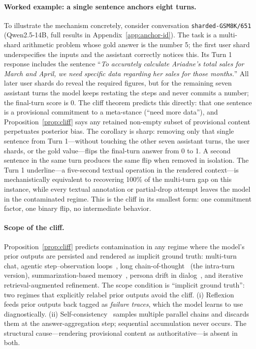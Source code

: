 \documentclass{article}
\begin{document}
\paragraph{Worked example: a single sentence anchors eight turns.}
\label{par:gsm8k651-example}
To illustrate the mechanism concretely, consider conversation \texttt{sharded-GSM8K/651} (Qwen2.5-14B, full results in Appendix~\ref{app:anchor-id}). The task is a multi-shard arithmetic problem whose gold answer is the number 5; the first user shard underspecifies the inputs and the assistant correctly notices this. Its Turn 1 response includes the sentence ``\emph{To accurately calculate Ariadne's total sales for March and April, we need specific data regarding her sales for those months.}'' All later user shards do reveal the required figures, but for the remaining seven assistant turns the model keeps restating the steps and never commits a number; the final-turn score is 0. The cliff theorem predicts this directly: that one sentence is a provisional commitment to a meta-stance (``need more data''), and Proposition~\ref{prop:cliff} says any retained non-empty subset of provisional content perpetuates posterior bias. The corollary is sharp: removing only that single sentence from Turn 1---without touching the other seven assistant turns, the user shards, or the gold value---flips the final-turn answer from 0 to 1. A second sentence in the same turn produces the same flip when removed in isolation. The Turn 1 underline---a five-second textual operation in the rendered context---is mechanistically equivalent to recovering 100\% of the multi-turn gap on this instance, while every textual annotation or partial-drop attempt leaves the model in the contaminated regime. This is the cliff in its smallest form: one commitment factor, one binary flip, no intermediate behavior.

\paragraph{Scope of the cliff.}
Proposition~\ref{prop:cliff} predicts contamination in any regime where the model's prior outputs are persisted and rendered as implicit ground truth: multi-turn chat, agentic step--observation loops~\citep{stechly2024brittle,taubench2024}, long chain-of-thought~\citep{thoughtanchors2025,curseofcot2025} (the intra-turn version), summarization-based memory~\citep{wu2023recursivesumm}, persona drift in dialog~\citep{lee2024personadrift}, and iterative retrieval-augmented refinement. The scope condition is ``implicit ground truth'': two regimes that explicitly relabel prior outputs avoid the cliff. (i) Reflexion~\citep{shinn2023reflexion} feeds prior outputs back tagged as \emph{failure traces}, which the model learns to use diagnostically. (ii) Self-consistency~\citep{wang2023selfconsistency} samples multiple parallel chains and discards them at the answer-aggregation step; sequential accumulation never occurs. The structural cause---rendering provisional content as authoritative---is absent in both.
\end{document}
